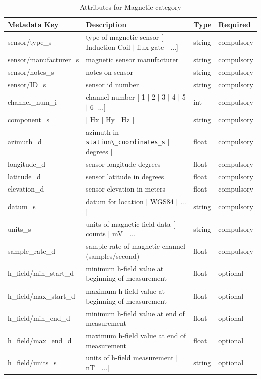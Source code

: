\documentclass{article}
\begin{document}
\begin{table}[htb!]
	\caption[Attributes for Magnetic Channel]{Attributes for Magnetic category}
	\begin{tabular}{|l|p{3in}|l|l|}
		\hline
		\textbf{Metadata Key} & \textbf{Description} & \textbf{Type} & \textbf{Required} \\ \hline
		sensor/type\_s & type of magnetic sensor [ Induction Coil $|$ flux gate $|$ ...] & string & compulsory \\ \hline
		sensor/manufacturer\_s & magnetic sensor manufacturer & string &  compulsory \\ \hline
		sensor/notes\_s & notes on sensor & string & compulsory \\ \hline
		sensor/ID\_s & sensor id number & string &  compulsory \\ \hline
		channel\_num\_i & channel number [ 1 $|$ 2 $|$ 3 $|$ 4 $|$ 5 $|$ 6 $|$...] & int &  compulsory \\ \hline
		component\_s & [ Hx $|$ Hy $|$ Hz ] & string  &  compulsory \\ \hline
		azimuth\_d & azimuth in \verb|station\_coordinates_s| [ degrees ]& float & compulsory \\ \hline
		longitude\_d & sensor longitude degrees & float & compulsory \\ \hline
		latitude\_d & sensor latitude in degrees & float &  compulsory \\ \hline
		elevation\_d & sensor elevation in meters & float &  compulsory \\ \hline
		datum\_s & datum for location [ WGS84 $|$ ... ] & string &  compulsory\\ \hline
		units\_s & units of magnetic field data [ counts $|$ mV $|$ ... ] & string &  compulsory \\ \hline
		sample\_rate\_d & sample rate of magnetic channel (samples/second) & float &  compulsory \\ \hline
		h\_field/min\_start\_d & minimum h-field value at beginning of measurement & float &  optional \\ \hline
		h\_field/max\_start\_d & maximum h-field value at beginning of measurement & float &  optional\\ \hline
		h\_field/min\_end\_d & minimum h-field value at end of measurement & float &  optional\\ \hline
		h\_field/max\_end\_d & maximum h-field value at end of measurement & float &  optional\\ \hline
		h\_field/units\_s & units of h-field measurement [ nT $|$ ...] & string &   optional \\ \hline

\end{tabular}
\end{table}
\end{document}
